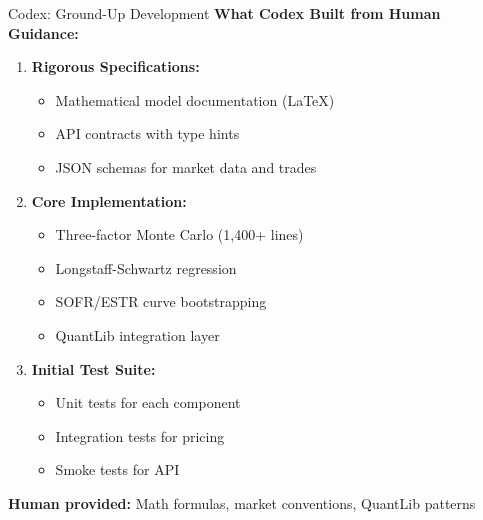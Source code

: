 \documentclass[aspectratio=169,11pt]{beamer}
\begin{document}
\begin{frame}{Codex: Ground-Up Development}
\textbf{What Codex Built from Human Guidance:}

\begin{enumerate}
    \item \textbf{Rigorous Specifications:}
    \begin{itemize}
        \item Mathematical model documentation (LaTeX)
        \item API contracts with type hints
        \item JSON schemas for market data and trades
    \end{itemize}

    \item \textbf{Core Implementation:}
    \begin{itemize}
        \item Three-factor Monte Carlo (1,400+ lines)
        \item Longstaff-Schwartz regression
        \item SOFR/ESTR curve bootstrapping
        \item QuantLib integration layer
    \end{itemize}

    \item \textbf{Initial Test Suite:}
    \begin{itemize}
        \item Unit tests for each component
        \item Integration tests for pricing
        \item Smoke tests for API
    \end{itemize}
\end{enumerate}

\textbf{Human provided:} Math formulas, market conventions, QuantLib patterns
\end{frame}
\end{document}
